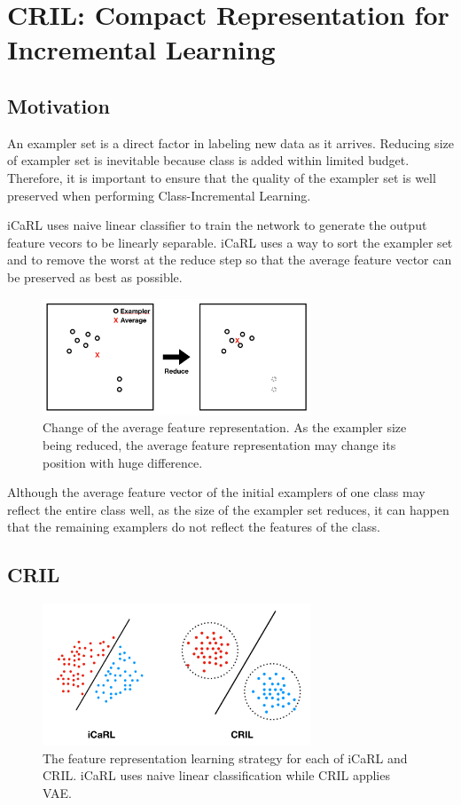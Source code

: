 
\section{CRIL: Compact Representation for Incremental Learning}
\label{sec:cril}

\subsection{Motivation}
\label{sec:motivation}

An exampler set is a direct factor in labeling new data as it arrives. Reducing size of exampler set is inevitable because class is added within limited budget. Therefore, it is important to ensure that the quality of the exampler set is well preserved when performing Class-Incremental Learning.

iCaRL uses naive linear classifier to train the network to generate the output feature vecors to be linearly separable. iCaRL uses a way to sort the exampler set and to remove the worst at the reduce step so that the average feature vector can be preserved as best as possible.

\begin{figure}[h]
\includegraphics[width=80mm]{data/compact_motivation.png}
\centering
\caption{Change of the average feature representation. As the exampler size being reduced, the average feature representation may change its position with huge difference. \label{fig:compact_motivation}}
\end{figure}
Although the average feature vector of the initial examplers of one class may reflect the entire class well, as the size of the exampler set reduces, it can happen that the remaining examplers do not reflect the features of the class.

\subsection{CRIL}

\begin{figure}[h]
\includegraphics[width=80mm]{data/compact_representation.png}
\centering
\caption{The feature representation learning strategy for each of iCaRL and CRIL. iCaRL uses naive linear classification while CRIL applies VAE. \label{fig:compact_representation}}
\end{figure}

